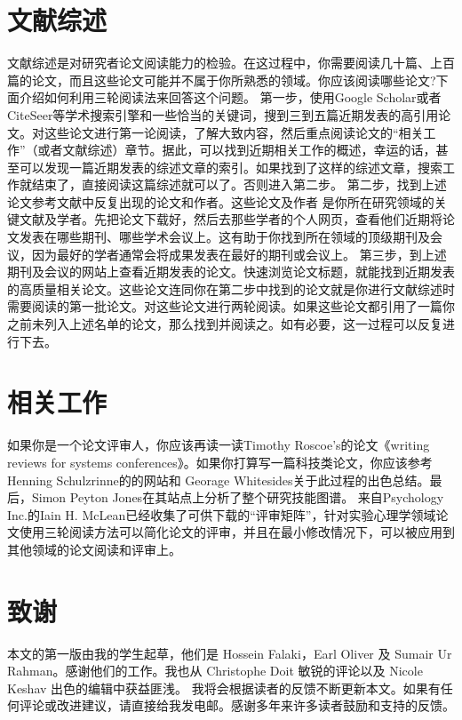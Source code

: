 \documentclass[a4paper,twocolumn]{article}
\begin{document}
		\section{文献综述}
		文献综述是对研究者论文阅读能力的检验。在这过程中，你需要阅读几十篇、上百篇的论文，而且这些论文可能并不属于你所熟悉的领域。你应该阅读哪些论文?下面介绍如何利用三轮阅读法来回答这个问题。
		第一步，使用Google Scholar或者CiteSeer等学术搜索引擎和一些恰当的关键词，搜到三到五篇近期发表的高引用论文。对这些论文进行第一论阅读，了解大致内容，然后重点阅读论文的“相关工作”（或者文献综述）章节。据此，可以找到近期相关工作的概述，幸运的话，甚至可以发现一篇近期发表的综述文章的索引。如果找到了这样的综述文章，搜索工作就结束了，直接阅读这篇综述就可以了。否则进入第二步。
		第二步，找到上述论文参考文献中反复出现的论文和作者。这些论文及作者 是你所在研究领域的关键文献及学者。先把论文下载好，然后去那些学者的个人网页，查看他们近期将论文发表在哪些期刊、哪些学术会议上。这有助于你找到所在领域的顶级期刊及会议，因为最好的学者通常会将成果发表在最好的期刊或会议上。
		第三步，到上述期刊及会议的网站上查看近期发表的论文。快速浏览论文标题，就能找到近期发表的高质量相关论文。这些论文连同你在第二步中找到的论文就是你进行文献综述时需要阅读的第一批论文。对这些论文进行两轮阅读。如果这些论文都引用了一篇你之前未列入上述名单的论文，那么找到并阅读之。如有必要，这一过程可以反复进行下去。
	
	\section{相关工作}
	如果你是一个论文评审人，你应该再读一读Timothy Roscoe's的论文《writing reviews for systems conferences》\cite{TR}。如果你打算写一篇科技类论文，你应该参考Henning Schulzrinne的的网站\cite{HS}和 Georage Whitesides关于此过程的出色总结\cite{GMW}。最后，Simon Peyton Jones在其站点上分析了整个研究技能图谱\cite{SPJ}。
	来自Psychology Inc.的Iain H. McLean已经收集了可供下载的“评审矩阵”，针对实验心理学领域论文使用三轮阅读方法可以简化论文的评审，并且在最小修改情况下，可以被应用到其他领域的论文阅读和评审上\cite{IHM}。
	
	\section{致谢}
	本文的第一版由我的学生起草，他们是 Hossein Falaki，Earl Oliver 及 Sumair Ur Rahman。感谢他们的工作。我也从 Christophe Doit 敏锐的评论以及 Nicole Keshav 出色的编辑中获益匪浅。
	我将会根据读者的反馈不断更新本文。如果有任何评论或改进建议，请直接给我发电邮。感谢多年来许多读者鼓励和支持的反馈。

	
	
\end{document}
